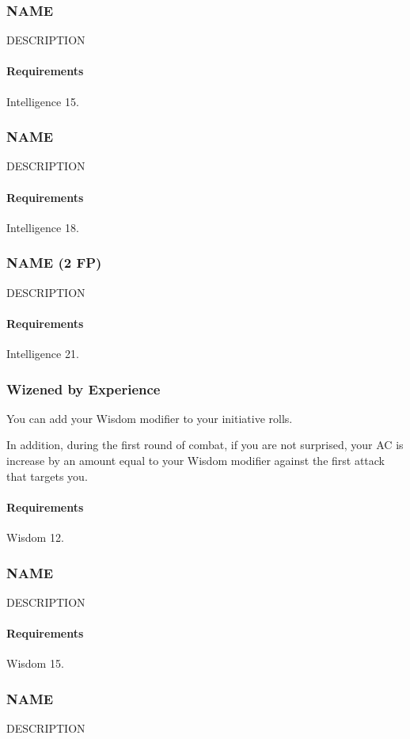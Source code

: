 \subsubsection{NAME} \label{feat::name}
    DESCRIPTION
    \paragraph{Requirements} Intelligence 15.
\subsubsection{NAME} \label{feat::name}
    DESCRIPTION
    \paragraph{Requirements} Intelligence 18.
\subsubsection{NAME (2 FP)} \label{feat::name}
    DESCRIPTION
    \paragraph{Requirements} Intelligence 21.
\subsubsection{Wizened by Experience} \label{feat::wizenedbyexperience}
    You can add your Wisdom modifier to your initiative rolls.

    In addition, during the first round of combat, if you are not surprised, your AC is increase by an amount equal to your Wisdom modifier against the first attack that targets you.
    \paragraph{Requirements} Wisdom 12.
\subsubsection{NAME} \label{feat::name}
    DESCRIPTION
    \paragraph{Requirements} Wisdom 15.
\subsubsection{NAME} \label{feat::name}
    DESCRIPTION
